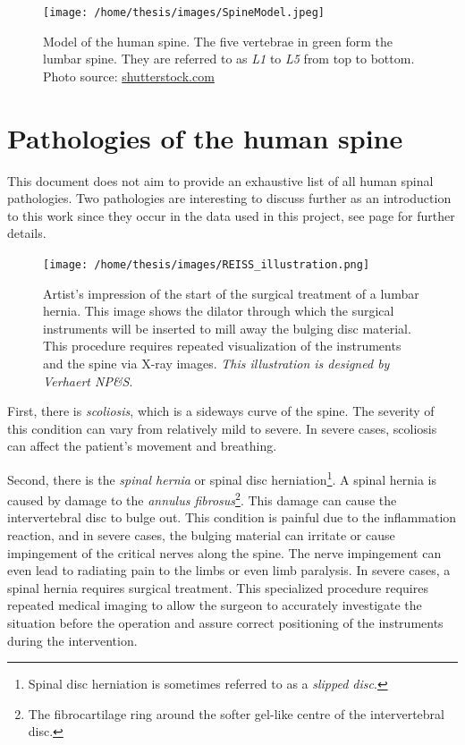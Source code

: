 \begin{figure}
    \centering
    \texttt{[image: /home/thesis/images/SpineModel.jpeg]}
    \caption{\label{fig:spineimage}Model of the human spine. The five vertebrae in green form the lumbar spine. They are referred to as \textit{L1} to \textit{L5} from top to bottom. Photo source: \url{shutterstock.com}}
\end{figure}

\section{Pathologies of the human spine}
\par{
    This document does not aim to provide an exhaustive list of all human spinal pathologies. 
    Two pathologies are interesting to discuss further as an introduction to this work since they occur in the data used in this project, see page \pageref{sec:datasets} for further details.
}
\begin{figure}
    \centering
    \texttt{[image: /home/thesis/images/REISS\_illustration.png]}
    \caption{Artist's impression of the start of the surgical treatment of a lumbar hernia. 
    This image shows the dilator through which the surgical instruments will be inserted to mill away the bulging disc material.
    This procedure requires repeated visualization of the instruments and the spine via X-ray images. \textit{This illustration is designed by Verhaert NP\&S}.\label{fig:REISS_procedure}}
\end{figure}
\par{
    First, there is \textit{scoliosis}, which is a sideways curve of the spine.
    The severity of this condition can vary from relatively mild to severe. 
    In severe cases, scoliosis can affect the patient's movement and breathing.
}
\par{
    Second, there is the \textit{spinal hernia} or spinal disc herniation\footnote{Spinal disc herniation is sometimes referred to as a \textit{slipped disc}.}. 
    A spinal hernia is caused by damage to the \textit{annulus fibrosus}\footnote{The fibrocartilage ring around the softer gel-like centre of the intervertebral disc.}. 
    This damage can cause the intervertebral disc to bulge out. 
    This condition is painful due to the inflammation reaction, and in severe cases, the bulging material can irritate or cause impingement of the critical nerves along the spine.
    The nerve impingement can even lead to radiating pain to the limbs or even limb paralysis.
    In severe cases, a spinal hernia requires surgical treatment.
    This specialized procedure requires repeated medical imaging to allow the surgeon to accurately investigate the situation before the operation and assure correct positioning of the instruments during the intervention.
}
